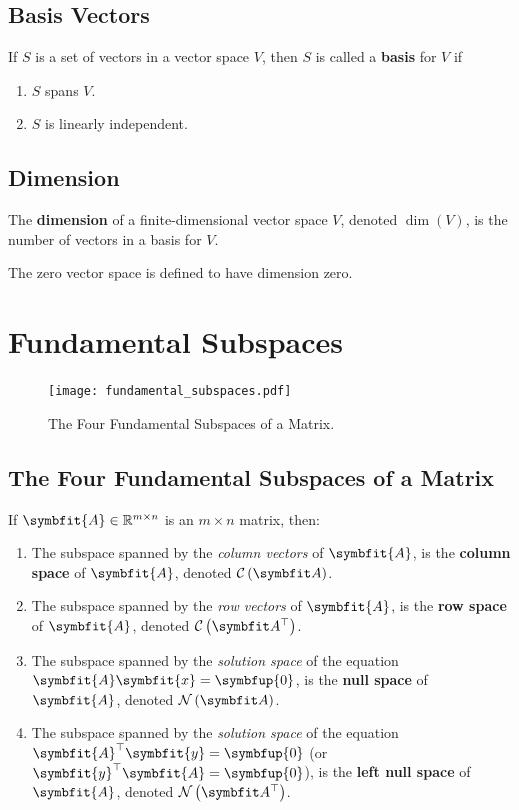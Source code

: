 \documentclass{article}
\begin{document}
	\subsection{Basis Vectors}
	\begin{definition}
		If $S$ is a set of vectors in a vector space $V$, then $S$ is called a \textbf{basis} for $V$ if
		\begin{enumerate}
			\item $S$ spans $V$.
			\item $S$ is linearly independent.
		\end{enumerate}
	\end{definition}
	\subsection{Dimension}
	\begin{definition}
		The \textbf{dimension} of a finite-dimensional vector space $V$, denoted $\dim{\left( V \right)}$, is the number of vectors in a basis for $V$.
	\end{definition}
	\begin{theorem}
		The zero vector space is defined to have dimension zero.
	\end{theorem}
	\newpage
\section{Fundamental Subspaces}
	\begin{figure}[H]
		\centering
		\texttt{[image: fundamental\_subspaces.pdf]}
		\caption{The Four Fundamental Subspaces of a Matrix.}
	\end{figure}
	\subsection{The Four Fundamental Subspaces of a Matrix}
	\begin{definition}
		If $\symbfit{A}\in\mathbb{R}^{m \times n}$ is an $m \times n$ matrix, then:
		\begin{enumerate}
			\item The subspace spanned by the \textit{column vectors} of $\symbfit{A}$, is the \textbf{column space} of $\symbfit{A}$, denoted $\columnspace{A}$.
			\item The subspace spanned by the \textit{row vectors} of $\symbfit{A}$, is the \textbf{row space} of $\symbfit{A}$, denoted $\rowspace{A}$.
			\item The subspace spanned by the \textit{solution space} of the equation $\symbfit{A}\symbfit{x}=\symbfup{0}$, is the \textbf{null space} of $\symbfit{A}$, denoted $\nullspace{A}$.
			\item The subspace spanned by the \textit{solution space} of the equation $\symbfit{A}^{\top}\symbfit{y}=\symbfup{0}$ (or $\symbfit{y}^{\top}\symbfit{A}=\symbfup{0}$), is the \textbf{left null space} of $\symbfit{A}$, denoted $\leftnullspace{A}$.
		\end{enumerate}  
	\end{definition}
\end{document}
